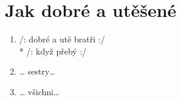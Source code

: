 \section{Jak dobré a utěšené}
\begin{enumerate}
\item /:  dobré a utě  bratři  :/ \\*
/:    když přebý :/ 
\item … sestry… 
\item … všichni… 
\end{enumerate}
